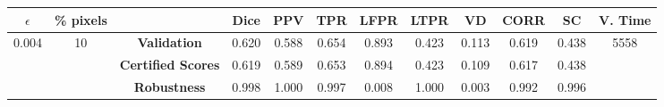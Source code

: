 \begin{longtable}{ c  c | c | c  c  c  c  c  c  c c c}
\toprule \textbf{$\epsilon$} & \textbf{\% pixels} & & \textbf{Dice} & \textbf{PPV} & \textbf{TPR} & \textbf{LFPR} & \textbf{LTPR} & \textbf{VD} & \textbf{CORR} & \textbf{SC} & \textbf{V. Time} \\
\midrule 
\multirow{3}{*}{0.004}  & \multirow{3}{*}{10} &\textbf{Validation} & 0.620 & 0.588 & 0.654 & 0.893 & 0.423 & 0.113 & 0.619 & 0.438 & \multirow{3}{*}{5558} \\
 & & \textbf{Certified Scores} & 0.619 & 0.589 & 0.653 & 0.894 & 0.423 & 0.109 & 0.617 & 0.438 & \\
& & \textbf{Robustness} & 0.998 & 1.000 & 0.997 & 0.008 & 1.000 & 0.003 & 0.992 & 0.996 & \\
\end{longtable}